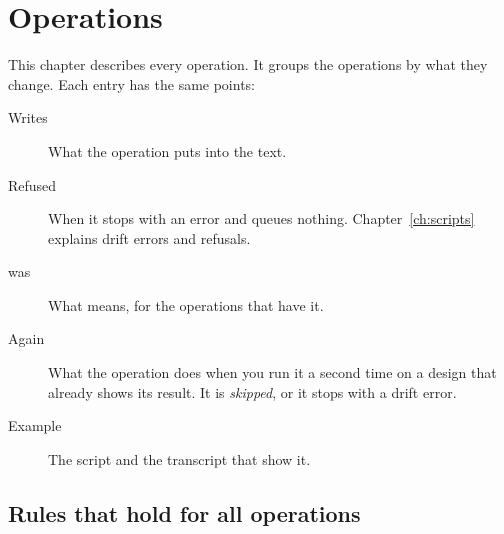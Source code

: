 \chapter{Operations}
\label{ch:operations}

This chapter describes every operation. It groups the operations by what they
change. Each entry has the same points:

\begin{description}
\item[Writes] What the operation puts into the text.
\item[Refused] When it stops with an error and queues nothing. Chapter~\ref{ch:scripts}
  explains drift errors and refusals.
\item[was] What  means, for the operations that have it.
\item[Again] What the operation does when you run it a second time on a design that
  already shows its result. It is \emph{skipped}, or it stops with a drift error.
\item[Example] The script and the transcript that show it.
\end{description}

\section{Rules that hold for all operations}

